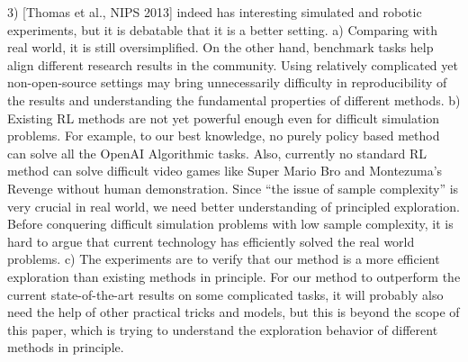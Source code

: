 \documentclass{article}
\begin{document}
3) [Thomas et al., NIPS 2013] indeed has interesting simulated and robotic experiments, but it is debatable that it is a better setting. a) Comparing with real world, it is still oversimplified. On the other hand, benchmark tasks help align different research results in the community. Using relatively complicated yet non-open-source settings may bring unnecessarily difficulty in reproducibility of the results and understanding the fundamental properties of different methods. b) Existing RL methods are not  yet powerful enough even for difficult simulation problems. For example, to our best knowledge, no purely policy based method can solve all the OpenAI Algorithmic tasks. Also, currently no standard RL method can solve difficult video games like Super Mario Bro and Montezuma's Revenge without human demonstration. Since ``the issue of sample complexity'' is very crucial in real world, we need better understanding of principled exploration. Before conquering difficult simulation problems with low sample complexity, it is hard to argue that current technology has efficiently solved the real world problems. c) The experiments are to verify that our method is a more efficient exploration than existing methods in principle. For our method to outperform the current state-of-the-art results on some complicated tasks, it will probably also need the help of other practical tricks and models, but this is beyond the scope of this paper, which is trying to understand the exploration behavior of different methods in principle.

\end{document}
